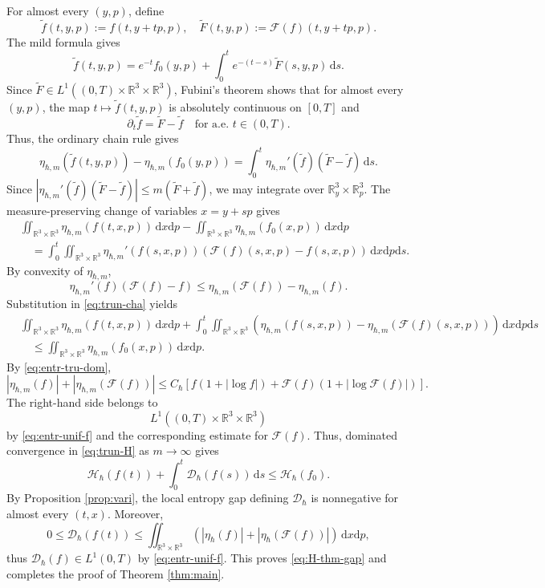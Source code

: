 \documentclass[10pt,reqno]{amsart}
\numberwithin{equation}{section}
\theoremstyle{definition}
\newcommand{\R}{\mathbb R}
\newcommand{\dx}{\mathrm{d}x}
\newcommand{\dpp}{\mathrm{d}p}
\newcommand{\ds}{\mathrm{d}s}
\newcommand{\calF}{\mathcal F}
\newcommand{\bq}{\begin{equation}}
\newcommand{\eq}{\end{equation}}
\newcommand{\lt}{\left}
\newcommand{\rt}{\right}
\newcommand{\pa}{\partial}
\begin{document}
For almost every $(y,p)$, define
\[
 \widetilde f(t,y,p):=f(t,y+tp,p),  \quad  \widetilde F(t,y,p):=\calF(f)(t,y+tp,p).
\]
The mild formula gives
\[
 \widetilde f(t,y,p)  =e^{-t}f_0(y,p)+\int_0^te^{-(t-s)}\widetilde F(s,y,p)\,\ds.
\]
Since $\widetilde F\in L^1((0,T)\times\R^3\times\R^3)$, Fubini's theorem shows that for almost every $(y,p)$, the map $t\mapsto\widetilde f(t,y,p)$ is absolutely continuous on $[0,T]$ and
\[
\pa_t\widetilde f=\widetilde F-\widetilde f  \quad\text{for a.e. }t\in(0,T).
\]
Thus, the ordinary chain rule gives
\[
 \eta_{\hbar,m}(\widetilde f(t,y,p))  -\eta_{\hbar,m}(f_0(y,p))  =\int_0^t\eta_{\hbar,m}'(\widetilde f)  (\widetilde F-\widetilde f)\,\ds.
\]
Since $|\eta_{\hbar,m}'(\widetilde f)(\widetilde F-\widetilde f)|\leq m(\widetilde F+\widetilde f)$, we may integrate over $\R^3_y\times\R^3_p$.  The measure-preserving change of variables $x=y+sp$ gives
\bq \label{eq:trun-cha}
 \begin{aligned}
 &\iint_{\R^3\times\R^3}\eta_{\hbar,m}(f(t,x,p))\,\dx\dpp  -\iint_{\R^3\times\R^3}\eta_{\hbar,m}(f_0(x,p))\,\dx\dpp\\
 &\quad=  \int_0^t\iint_{\R^3\times\R^3}  \eta_{\hbar,m}'(f(s,x,p))  \lt(\calF(f)(s,x,p)-f(s,x,p)\rt)\,\dx\dpp\ds.
 \end{aligned}
\eq
By convexity of $\eta_{\hbar,m}$,
\[
 \eta_{\hbar,m}'(f)(\calF(f)-f)  \leq\eta_{\hbar,m}(\calF(f))-\eta_{\hbar,m}(f).
\]
Substitution in \eqref{eq:trun-cha} yields
\bq \label{eq:trun-H}
 \begin{aligned}
 &\iint_{\R^3\times\R^3}\eta_{\hbar,m}(f(t,x,p))\,\dx\dpp +\int_0^t\iint_{\R^3\times\R^3}  \lt(\eta_{\hbar,m}(f(s,x,p)) -\eta_{\hbar,m}(\calF(f)(s,x,p))\rt) \,\dx\dpp\ds\\
  &\quad \leq\iint_{\R^3\times\R^3}\eta_{\hbar,m}(f_0(x,p))\,\dx\dpp.
 \end{aligned}
\eq
By \eqref{eq:entr-tru-dom},
\[
 |\eta_{\hbar,m}(f)|  +  |\eta_{\hbar,m}(\calF(f))|  \leq  C_\hbar  \lt[  f(1+|\log f|)  +  \calF(f)\lt(1+|\log\calF(f)|\rt)  \rt].
\]
The right-hand side belongs to
\[
 L^1((0,T)\times\R^3\times\R^3)
\]
by \eqref{eq:entr-unif-f} and the corresponding estimate for $\calF(f)$. Thus, dominated convergence in \eqref{eq:trun-H} as $m\to\infty$ gives
\[
 \mathscr H_\hbar(f(t))  +\int_0^t\mathscr D_\hbar(f(s))\,\ds  \leq\mathscr H_\hbar(f_0).
\]
By Proposition \ref{prop:vari}, the local entropy gap defining $\mathscr D_\hbar$ is nonnegative for almost every $(t,x)$.  Moreover,
\[
 0\leq\mathscr D_\hbar(f(t))  \leq\iint_{\R^3\times\R^3}  \lt(|\eta_\hbar(f)|+|\eta_\hbar(\calF(f))|\rt)\,\dx\dpp,
\]
thus $\mathscr D_\hbar(f)\in L^1(0,T)$ by \eqref{eq:entr-unif-f}.  This proves \eqref{eq:H-thm-gap} and completes the proof of Theorem \ref{thm:main}.
\end{document}
